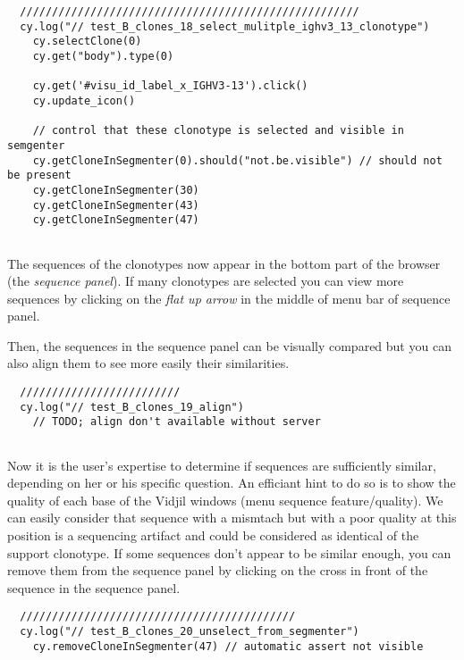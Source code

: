 \begin{verbatim}
  /////////////////////////////////////////////////////
  cy.log("// test_B_clones_18_select_mulitple_ighv3_13_clonotype")
    cy.selectClone(0)
    cy.get("body").type(0)

    cy.get('#visu_id_label_x_IGHV3-13').click()
    cy.update_icon()

    // control that these clonotype is selected and visible in semgenter
    cy.getCloneInSegmenter(0).should("not.be.visible") // should not be present
    cy.getCloneInSegmenter(30)
    cy.getCloneInSegmenter(43)
    cy.getCloneInSegmenter(47)


\end{verbatim}

The sequences of the clonotypes now appear in the bottom part of the browser (the
\textit{sequence panel}). If many clonotypes are selected you can view more sequences
by clicking on the \textit{flat up arrow} in the middle of menu bar of sequence panel.
 
Then, the sequences in the sequence panel can be visually compared but you can also align
them to see more easily their similarities.


\begin{verbatim}
  /////////////////////////
  cy.log("// test_B_clones_19_align")
    // TODO; align don't available without server


\end{verbatim}

Now it is the user's expertise to determine if sequences are sufficiently
similar, depending on her or his specific question. 
An efficiant hint to do so is to show the quality of each base of the Vidjil windows (menu sequence feature/quality). 
We can easily consider that sequence with a mismtach but with a poor quality at this position is a sequencing artifact and could be considered as identical of the support clonotype.
If some sequences don't appear to be similar enough, you can remove
them from the sequence panel by clicking on the cross in front of the sequence in
the sequence panel.
\begin{verbatim}
  ///////////////////////////////////////////
  cy.log("// test_B_clones_20_unselect_from_segmenter")
    cy.removeCloneInSegmenter(47) // automatic assert not visible


\end{verbatim}

